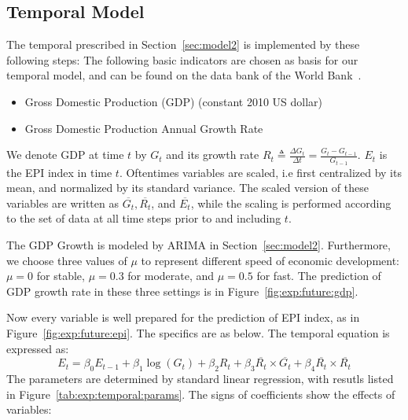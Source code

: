 \subsection{Temporal Model}
\label{sec:exp:temporal}
The temporal prescribed in Section~\ref{sec:model2} is implemented by these following steps:
    The following basic indicators are chosen as basis for our temporal model, and can be found on the data bank of the World Bank~.
    \begin{itemize}
       \item Gross Domestic Production (GDP) (constant 2010 US dollar) 
       \item Gross Domestic Production Annual Growth Rate
    \end{itemize}
    We denote GDP at time $t$ by $G_t$ and its growth rate $R_t
    \triangleq\frac{\Delta G_t}{\Delta t} = \frac{G_t-G_{t-1}}{G_{t-1}}$. $E_t$ is the EPI index in time $t$. Oftentimes variables are scaled, i.e first centralized by its mean, and normalized by its standard variance.
    The scaled version of these variables are written as $\overline{G_t}, \overline{R_t}$, and $\overline{E_t}$, while the scaling is performed according to the set of data at all time steps prior to and including $t$.

The GDP Growth is modeled by ARIMA in Section~\ref{sec:model2}.
Furthermore, we choose three values of $\mu$ to represent different speed of economic development: $\mu=0$ for stable, $\mu=0.3$ for moderate, and $\mu=0.5$ for fast.
The prediction of GDP growth rate in these three settings is in Figure~\ref{fig:exp:future:gdp}.


    Now every variable is well prepared for the prediction of EPI index, as in Figure~\ref{fig:exp:future:epi}. The specifics are as below.
    The temporal equation is expressed as:
    \begin{equation}
       E_t = \beta_0 E_{t-1} + \beta_1 \log(G_t) + \beta_2 R_t + \beta_3 \overline{R_t}\times\overline{G_t} + \beta_4\overline{R_t}\times\overline{R_t}
       \label{eqn:exp:temporal:regression}
    \end{equation}
    The parameters are determined by standard linear regression, with resutls listed in Figure~\ref{tab:exp:temporal:params}. The signs of coefficients show the effects of variables:
    
